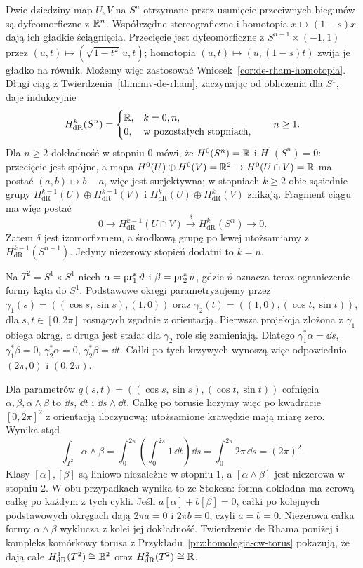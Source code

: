 \begin{przyklad}
\label{prz:de-rham-sfery-torus}
Dwie dziedziny map $U,V$ na $S^n$ otrzymane przez usunięcie
przeciwnych biegunów są dyfeomorficzne z $\mathbb{R}^n$.
Współrzędne stereograficzne i homotopia $x\mapsto(1-s)x$
dają ich gładkie ściągnięcia. Przecięcie jest
dyfeomorficzne z $S^{n-1}\times(-1,1)$ przez
$(u,t)\mapsto(\sqrt{1-t^2}\,u,t)$; homotopia
$(u,t)\mapsto(u,(1-s)t)$ zwija je gładko na równik.
Możemy więc zastosować
Wniosek~\ref{cor:de-rham-homotopia}.
Długi ciąg z
Twierdzenia~\ref{thm:mv-de-rham}, zaczynając od
obliczenia dla $S^1$, daje indukcyjnie
\[
 H^k_{\mathrm{dR}}(S^n)=
 \begin{cases}\mathbb{R},&k=0,n,\\0,&\text{w pozostałych stopniach,}\end{cases}
 \qquad n\geq1.
\]
Dla $n\geq2$ dokładność w stopniu $0$ mówi,
że $H^0(S^n)=\mathbb{R}$ i $H^1(S^n)=0$:
przecięcie jest spójne, a mapa
$H^0(U)\oplus H^0(V)=\mathbb{R}^2\to H^0(U\cap V)=\mathbb{R}$
ma postać $(a,b)\mapsto b-a$, więc jest surjektywna;
w stopniach $k\geq2$ obie sąsiednie grupy
$H^{k-1}_{\mathrm{dR}}(U)\oplus H^{k-1}_{\mathrm{dR}}(V)$
i $H^k_{\mathrm{dR}}(U)\oplus H^k_{\mathrm{dR}}(V)$
znikają. Fragment ciągu ma więc postać
\[
 0\longrightarrow H^{k-1}_{\mathrm{dR}}(U\cap V)
 \xrightarrow{\delta}H^k_{\mathrm{dR}}(S^n)
 \longrightarrow0.
\]
Zatem $\delta$ jest izomorfizmem, a środkową grupę
po lewej utożsamiamy z $H^{k-1}_{\mathrm{dR}}(S^{n-1})$.
Jedyny niezerowy stopień dodatni to $k=n$.

Na $T^2=S^1\times S^1$ niech
$\alpha=\operatorname{pr}_1^*\vartheta$ i
$\beta=\operatorname{pr}_2^*\vartheta$, gdzie $\vartheta$ oznacza
teraz ograniczenie formy kąta do $S^1$.
Podstawowe okręgi parametryzujemy przez
$\gamma_1(s)=((\cos s,\sin s),(1,0))$ oraz
$\gamma_2(t)=((1,0),(\cos t,\sin t))$,
dla $s,t\in[0,2\pi]$ rosnących zgodnie z orientacją.
Pierwsza projekcja złożona z $\gamma_1$ obiega okrąg,
a druga jest stała; dla $\gamma_2$ role się zamieniają.
Dlatego $\gamma_1^*\alpha=\dd s$, $\gamma_1^*\beta=0$,
$\gamma_2^*\alpha=0$, $\gamma_2^*\beta=\dd t$.
Całki po tych krzywych wynoszą więc odpowiednio
$(2\pi,0)$ i $(0,2\pi)$.

Dla parametrów
$q(s,t)=((\cos s,\sin s),(\cos t,\sin t))$
cofnięcia $\alpha,\beta,\alpha\wedge\beta$ to $\dd s$, $\dd t$ i
$\dd s\wedge\dd t$. Całkę po torusie liczymy więc
po kwadracie $[0,2\pi]^2$ z orientacją iloczynową;
utożsamione krawędzie mają miarę zero.
Wynika stąd
\[
 \int_{T^2}\alpha\wedge\beta
 =\int_0^{2\pi}\left(\int_0^{2\pi}1\,\dd t\right)\dd s
 =\int_0^{2\pi}2\pi\,\dd s=(2\pi)^2.
\]
Klasy $[\alpha],[\beta]$ są liniowo niezależne w stopniu $1$,
a $[\alpha\wedge\beta]$ jest niezerowa w stopniu $2$.
W obu przypadkach wynika to ze Stokesa: forma dokładna
ma zerową całkę po każdym z tych cykli.
Jeśli $a[\alpha]+b[\beta]=0$, całki po kolejnych
podstawowych okręgach dają $2\pi a=0$ i $2\pi b=0$,
czyli $a=b=0$. Niezerowa całka formy $\alpha\wedge\beta$
wyklucza z kolei jej dokładność.
Twierdzenie de Rhama poniżej i kompleks komórkowy
torusa z Przykładu~\ref{prz:homologia-cw-torus}
pokazują, że dają całe
$H^1_{\mathrm{dR}}(T^2)\cong\mathbb{R}^2$ oraz
$H^2_{\mathrm{dR}}(T^2)\cong\mathbb{R}$.
\end{przyklad}


